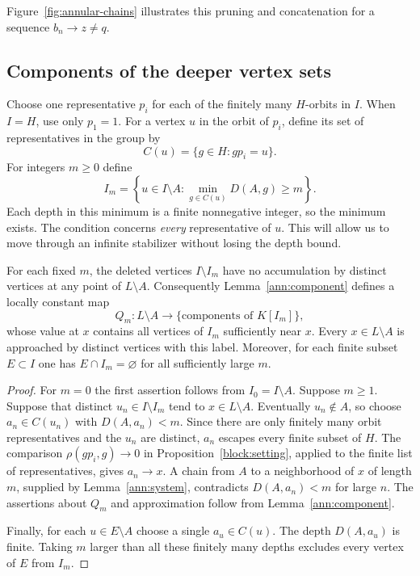 Figure~\ref{fig:annular-chains} illustrates this pruning and
concatenation for a sequence $b_n\to z\ne q$.


\subsection{Components of the deeper vertex sets}

Choose one representative $p_i$ for each of the finitely many
$H$-orbits in $I$.  When $I=H$, use only $p_1=1$.
For a vertex $u$ in the orbit of $p_i$, define its set of representatives
in the group by
\[
 C(u)=\{g\in H:g p_i=u\}.
\]
For integers $m\ge0$ define
\begin{equation}\label{eq:push-deep-vertices}
 I_m=\left\{u\in I\setminus A:
           \min_{g\in C(u)}D(A,g)\ge m\right\}.
\end{equation}
Each depth in this minimum is a finite nonnegative integer, so the
minimum exists.  The condition concerns \emph{every} representative of
$u$.  This will allow us to move through an infinite stabilizer without
losing the depth bound.

\begin{lemma}\label{push:component-labels}
For each fixed $m$, the deleted vertices $I\setminus I_m$ have no
accumulation by distinct vertices at any point of $L\setminus A$.
Consequently Lemma~\ref{ann:component} defines a locally constant map
\[
 Q_m:L\setminus A\longrightarrow
      \{\text{components of }K[I_m]\},
\]
whose value at $x$ contains all vertices of $I_m$ sufficiently near $x$.
Every $x\in L\setminus A$ is approached by distinct vertices with this
label.  Moreover, for each finite subset $E\subset I$ one has
$E\cap I_m=\varnothing$ for all sufficiently large $m$.
\end{lemma}
\begin{proof}
For $m=0$ the first assertion follows from $I_0=I\setminus A$.
Suppose $m\ge1$.
Suppose that distinct $u_n\in I\setminus I_m$ tend to
$x\in L\setminus A$.
Eventually $u_n\notin A$, so choose $a_n\in C(u_n)$ with $D(A,a_n)<m$.
Since there are only finitely many orbit representatives and the $u_n$
are distinct, $a_n$ escapes every finite subset of $H$.
The comparison $\rho(gp_i,g)\to0$ in Proposition~\ref{block:setting},
applied to the finite list of representatives, gives $a_n\to x$.
A chain from $A$ to a neighborhood of $x$ of length $m$, supplied by
Lemma~\ref{ann:system}, contradicts $D(A,a_n)<m$ for large $n$.
The assertions about $Q_m$ and approximation follow from
Lemma~\ref{ann:component}.

Finally, for each $u\in E\setminus A$ choose a single $a_u\in C(u)$.
The depth $D(A,a_u)$ is finite.  Taking $m$ larger than all these finitely
many depths excludes every vertex of $E$ from $I_m$.
\end{proof}

